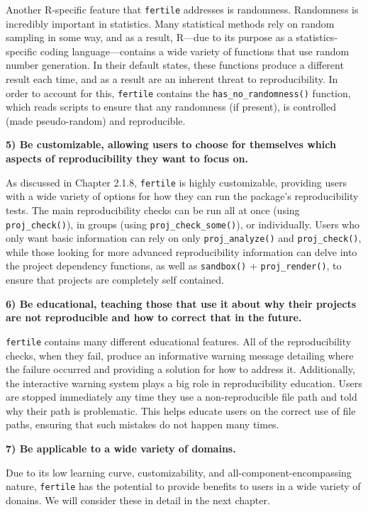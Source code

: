 \documentclass[12pt,twoside]{reedthesis}
\begin{document}
Another R-specific feature that \texttt{fertile} addresses is
randomness. Randomness is incredibly important in statistics. Many
statistical methods rely on random sampling in some way, and as a
result, R---due to its purpose as a statistics-specific coding
language---contains a wide variety of functions that use random number
generation. In their default states, these functions produce a different
result each time, and as a result are an inherent threat to
reproducibility. In order to account for this, \texttt{fertile} contains
the \texttt{has\_no\_randomness()} function, which reads scripts to
ensure that any randomness (if present), is controlled (made
pseudo-random) and reproducible.

\textbf{5) Be customizable, allowing users to choose for themselves
which aspects of reproducibility they want to focus on.}

As discussed in Chapter 2.1.8, \texttt{fertile} is highly customizable,
providing users with a wide variety of options for how they can run the
package's reproducibility tests. The main reproducibility checks can be
run all at once (using \texttt{proj\_check()}), in groups (using
\texttt{proj\_check\_some()}), or individually. Users who only want
basic information can rely on only \texttt{proj\_analyze()} and
\texttt{proj\_check()}, while those looking for more advanced
reproducibility information can delve into the project dependency
functions, as well as \texttt{sandbox()} + \texttt{proj\_render()}, to
ensure that projects are completely self contained.

\textbf{6) Be educational, teaching those that use it about why their
projects are not reproducible and how to correct that in the future.}

\texttt{fertile} contains many different educational features. All of
the reproducibility checks, when they fail, produce an informative
warning message detailing where the failure occurred and providing a
solution for how to address it. Additionally, the interactive warning
system plays a big role in reproducibility education. Users are stopped
immediately any time they use a non-reproducible file path and told why
their path is problematic. This helps educate users on the correct use
of file paths, ensuring that such mistakes do not happen many times.

\textbf{7) Be applicable to a wide variety of domains.}

Due to its low learning curve, customizability, and
all-component-encompassing nature, \texttt{fertile} has the potential to
provide benefits to users in a wide variety of donains. We will consider
these in detail in the next chapter.
\end{document}
